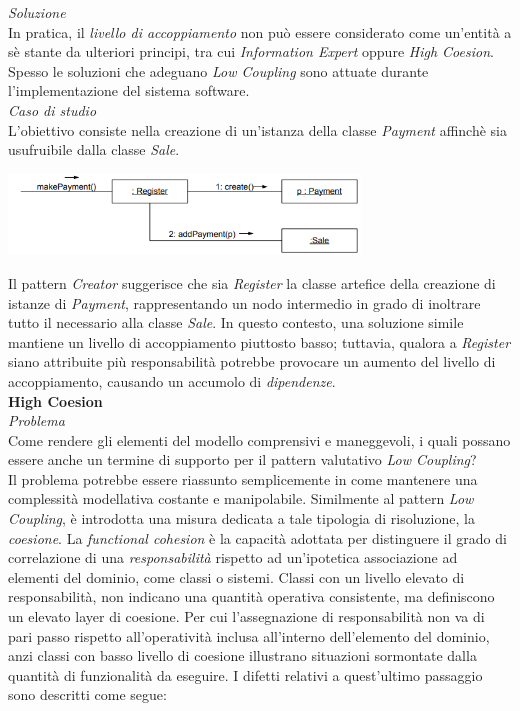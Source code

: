 \documentclass{article}
\begin{document}
\textit{Soluzione}\\
In pratica, il \textit{livello di accoppiamento} non può essere considerato come un'entità a sè stante da ulteriori principi, tra cui \textit{Information Expert} oppure \textit{High Coesion}. Spesso le soluzioni che adeguano \textit{Low Coupling} sono attuate durante l'implementazione del sistema software.\vspace*{14pt}\\
\textit{Caso di studio}\\
L'obiettivo consiste nella creazione di un'istanza della classe \textit{Payment} affinchè sia usufruibile dalla classe \textit{Sale}.\vspace*{7pt}
\begin{center}
    \includegraphics*[width=0.7\textwidth]{foto 3.png}
\end{center} 
Il pattern \textit{Creator} suggerisce che sia \textit{Register} la classe artefice della creazione di istanze di \textit{Payment}, rappresentando un nodo intermedio in grado di inoltrare tutto il necessario alla classe \textit{Sale}. In questo contesto, una soluzione simile mantiene un livello di accoppiamento piuttosto basso; tuttavia, qualora a \textit{Register} siano attribuite più responsabilità potrebbe provocare un aumento del livello di accoppiamento, causando un accumolo di \textit{dipendenze}.\vspace*{14pt}\\
\textbf{High Coesion}\vspace*{7pt}\\
\textit{Problema}\\
Come rendere gli elementi del modello comprensivi e maneggevoli, i quali possano essere anche un termine di supporto per il pattern valutativo \textit{Low Coupling}?\vspace*{14pt}\\
Il problema potrebbe essere riassunto semplicemente in come mantenere una complessità modellativa costante e manipolabile. Similmente al pattern \textit{Low Coupling}, è introdotta una misura dedicata a tale tipologia di risoluzione, la \textit{coesione}. La \textit{functional cohesion} è la capacità adottata per distinguere il grado di correlazione di una \textit{responsabilità} rispetto ad un'ipotetica associazione ad elementi del dominio, come classi o sistemi. Classi con un livello elevato di responsabilità, non indicano una quantità operativa consistente, ma definiscono un elevato layer di coesione. Per cui l'assegnazione di responsabilità non va di pari passo rispetto all'operatività inclusa all'interno dell'elemento del dominio, anzi classi con basso livello di coesione illustrano situazioni sormontate dalla quantità di funzionalità da eseguire. I difetti relativi a quest'ultimo passaggio sono descritti come segue:
\end{document}
